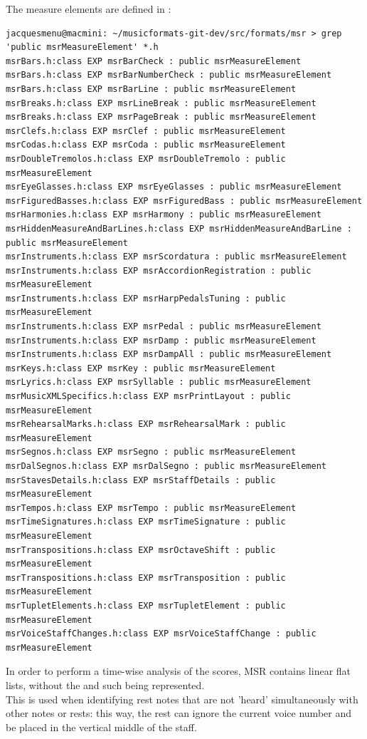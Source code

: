 The measure elements are defined in \msr{}:
\begin{lstlisting}[language=Terminal]
jacquesmenu@macmini: ~/musicformats-git-dev/src/formats/msr > grep  'public msrMeasureElement' *.h
msrBars.h:class EXP msrBarCheck : public msrMeasureElement
msrBars.h:class EXP msrBarNumberCheck : public msrMeasureElement
msrBars.h:class EXP msrBarLine : public msrMeasureElement
msrBreaks.h:class EXP msrLineBreak : public msrMeasureElement
msrBreaks.h:class EXP msrPageBreak : public msrMeasureElement
msrClefs.h:class EXP msrClef : public msrMeasureElement
msrCodas.h:class EXP msrCoda : public msrMeasureElement
msrDoubleTremolos.h:class EXP msrDoubleTremolo : public msrMeasureElement
msrEyeGlasses.h:class EXP msrEyeGlasses : public msrMeasureElement
msrFiguredBasses.h:class EXP msrFiguredBass : public msrMeasureElement
msrHarmonies.h:class EXP msrHarmony : public msrMeasureElement
msrHiddenMeasureAndBarLines.h:class EXP msrHiddenMeasureAndBarLine : public msrMeasureElement
msrInstruments.h:class EXP msrScordatura : public msrMeasureElement
msrInstruments.h:class EXP msrAccordionRegistration : public msrMeasureElement
msrInstruments.h:class EXP msrHarpPedalsTuning : public msrMeasureElement
msrInstruments.h:class EXP msrPedal : public msrMeasureElement
msrInstruments.h:class EXP msrDamp : public msrMeasureElement
msrInstruments.h:class EXP msrDampAll : public msrMeasureElement
msrKeys.h:class EXP msrKey : public msrMeasureElement
msrLyrics.h:class EXP msrSyllable : public msrMeasureElement
msrMusicXMLSpecifics.h:class EXP msrPrintLayout : public msrMeasureElement
msrRehearsalMarks.h:class EXP msrRehearsalMark : public msrMeasureElement
msrSegnos.h:class EXP msrSegno : public msrMeasureElement
msrDalSegnos.h:class EXP msrDalSegno : public msrMeasureElement
msrStavesDetails.h:class EXP msrStaffDetails : public msrMeasureElement
msrTempos.h:class EXP msrTempo : public msrMeasureElement
msrTimeSignatures.h:class EXP msrTimeSignature : public msrMeasureElement
msrTranspositions.h:class EXP msrOctaveShift : public msrMeasureElement
msrTranspositions.h:class EXP msrTransposition : public msrMeasureElement
msrTupletElements.h:class EXP msrTupletElement : public msrMeasureElement
msrVoiceStaffChanges.h:class EXP msrVoiceStaffChange : public msrMeasureElement
\end{lstlisting}


In order to perform a time-wise analysis of the scores, MSR contains  linear flat lists, without the  and such being represented.\\
This is used when identifying rest notes that are not 'heard' simultaneously with other notes or rests: this way, the rest can ignore the current voice number and be placed in the vertical middle of the staff.

